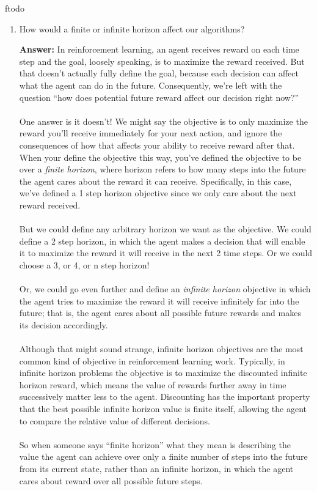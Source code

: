 ƒtodo\documentclass{article}
\newenvironment{QandA}{\begin{enumerate}[label=\arabic*.]}{\end{enumerate}}
\newenvironment{answer}{\par\normalfont \textbf{Answer:}}{}
\begin{document}
\begin{QandA}
    \item How would a finite or infinite horizon affect our algorithms?
    \begin{answer}
        In reinforcement learning, an agent receives reward on each time step and the goal, loosely speaking, is to maximize the reward received. But that doesn’t actually fully define the goal, because each decision can affect what the agent can do in the future. Consequently, we’re left with the question “how does potential future reward affect our decision right now?”\\\\
        One answer is it doesn’t! We might say the objective is to only maximize the reward you’ll receive immediately for your next action, and ignore the consequences of how that affects your ability to receive reward after that. When your define the objective this way, you’ve defined the objective to be over a \textit{finite horizon}, where horizon refers to how many steps into the future the agent cares about the reward it can receive. Specifically, in this case, we’ve defined a 1 step horizon objective since we only care about the next reward received.\\\\
        But we could define any arbitrary horizon we want as the objective. We could define a 2 step horizon, in which the agent makes a decision that will enable it to maximize the reward it will receive in the next 2 time steps. Or we could choose a 3, or 4, or n step horizon!\\\\
        Or, we could go even further and define an \textit{infinite horizon} objective in which the agent tries to maximize the reward it will receive infinitely far into the future; that is, the agent cares about all possible future rewards and makes its decision accordingly. \\\\
        Although that might sound strange, infinite horizon objectives are the most common kind of objective in reinforcement learning work. Typically, in infinite horizon problems the objective is to maximize the discounted infinite horizon reward, which means the value of rewards further away in time successively matter less to the agent. Discounting has the important property that the best possible infinite horizon value is finite itself, allowing the agent to compare the relative value of different decisions.\\\\
        So when someone says “finite horizon” what they mean is describing the value the agent can achieve over only a finite number of steps into the future from its current state, rather than an infinite horizon, in which the agent cares about reward over all possible future steps.


\end{answer}
\end{QandA}
\end{document}

